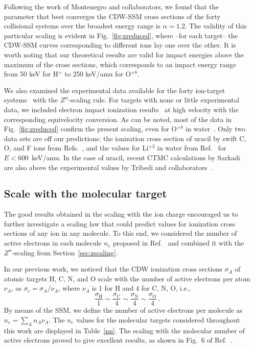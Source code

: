 \documentclass[10pt,showpacs,showkeys,twocolumn]{revtex4-1}
\begin{document}
Following the work of Montenegro and collaborators, we found that the 
parameter that best converges the CDW-SSM cross sections of the forty 
collisional systems over the broadest energy range is $\alpha=1.2$. 
The validity of this particular scaling is evident in 
Fig.~\ref{fig:zreduced}, where --for each target-- the CDW-SSM curves
corresponding to different ions lay one over the other. 
It is worth noting that our theoretical results are valid for impact
energies above the maximum of the cross sections, which corresponds to 
an impact energy range from 50 keV for H$^+$ to 250 keV/amu for 
O$^{+8}$.

We also examined the experimental data available for the forty 
ion-target systems~\cite{itoh2013,iriki2011,wolff2014,wang2016,
tribedi2019,agnihotri2012,agnihotri2013,Luna2007,Rudd86,pRudd85,
toburen80,Ohsawa05,Bhattacharjee17,Luna_Li_water,DalCappello2009,
Tribedi_O_water} with the $Z^\alpha$-scaling rule. For targets with 
none or little experimental data, we included electron impact 
ionization results~\cite{rahman2016,bug2017,wolf2019,fuss2009} at high 
velocity with the corresponding equivelocity conversion. As can be 
noted, most of the data in Fig.~\ref{fig:zreduced} confirm the present 
scaling, even for O$^{+8}$ in water~\cite{Tribedi_O_water}. Only two 
data sets are off our predictions: the ionization cross section of 
uracil by swift C, O, and F ions from Refs.~\cite{agnihotri2012,
agnihotri2013}, and the values for Li$^{+3}$ in water from 
Ref.~\cite{Luna_Li_water} for $E<600$~keV/amu. In the case of uracil, 
recent CTMC calculations by Sarkadi~\cite{sarkadi2016} are also above 
the experimental values by Tribedi and collaborators~\cite{agnihotri2012,
agnihotri2013}.

\subsection{Scale with the molecular target}

The good results obtained in the scaling with the ion charge 
encouraged us to further investigate a scaling law that could 
predict values for ionization cross sections of any ion in any 
molecule. To this end, we considered the number of active electrons 
in each molecule $n_e$ proposed in Ref.~\cite{MendezJPB20} and combined 
it with the $Z^\alpha$-scaling from Section~\ref{sec:zscaling}.

In our previous work, we noticed that the CDW ionization cross sections 
$\sigma_A$ of atomic targets H, C, N, and O scale with the number of 
active electrons per atom $\nu_A$, as \mbox{$\sigma_e=\sigma_A/\nu_A$,} 
where $\nu_A$ is $1$ for H and $4$ for C, N, O, i.e.,
\begin{equation}
 \frac{\sigma_{\mathrm{H}}}{1}\sim
 \frac{\sigma_{\mathrm{C}}}{4}\sim
 \frac{\sigma_{\mathrm{N}}}{4}\sim
 \frac{\sigma_{\mathrm{O}}}{4}\,.
\end{equation}
By means of the SSM, we define the number of active electrons per 
molecule as $n_e=\sum_A n_A \nu_A$. The $n_e$ values for the 
molecular targets considered throughout this work are displayed in 
Table~\ref{nn}. The scaling with the molecular number of active
electrons proved to give excellent results, as shown in Fig.~6 of 
Ref.~\cite{MendezJPB20}.
\end{document}
